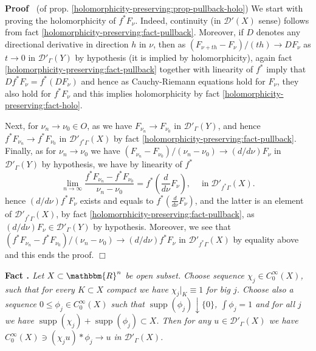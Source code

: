 \documentclass{article}
\newcommand{\nocomma}{}
\newcommand{\nosymbol}{}
\newcommand{\tmop}[1]{\ensuremath{\operatorname{#1}}}
\newcommand{\tmtextbf}[1]{{\bfseries{#1}}}
\newcommand{\tmtextit}[1]{{\itshape{#1}}}
\newcommand{\tmtextup}[1]{{\upshape{#1}}}
\newenvironment{proof}{\noindent\textbf{Proof\ }}{\hspace*{\fill}$\Box$\medskip}
\numberwithin{definition}{section}
\numberwithin{lemma}{section}
\numberwithin{proposition}{section}
{\theorembodyfont{\rmfamily}\newtheorem{remark}{Remark}
\numberwithin{remark}{section}
}
\begin{document}
\begin{proof}
  (of prop. \ref{holomorphicity-preserving:prop-pullback-holo}) We start with
  proving the holomorphicity of $f^{\ast} F_{\nu} \nosymbol$. Indeed,
  continuity (in $\mathcal{D}' ( X)$ sense) follows from fact
  \ref{holomorphicity-preserving:fact-pullback}. Moreover, if $D$ denotes any
  directional derivative in direction $h$ in $\nu$, then as $( F_{\nu + t h} -
  F_{\nu}) / ( t h) \rightarrow D F_{\nu}$ as $t \rightarrow 0$ in
  $\mathcal{D}'_{\Gamma} ( Y)$ by hypothesis (it is implied by
  holomorphicity), again fact \ref{holomorphicity-preserving:fact-pullback}
  together with linearity of $f^{\ast}$ imply that $D f^{\ast} F_{\nu} =
  f^{\ast} ( D F_{\nu})$ and hence as Cauchy-Riemann equations hold for
  $F_{\nu}$, they also hold for $f^{\ast} F_{\nu}$ and this implies
  holomorphicity by fact \ref{holomorphicity-preserving:fact-holo}.
  
  Next, for $\nu_n \rightarrow \nu_0 \in O$, as we have $F_{\nu_n} \rightarrow
  F_{\nu_0}$ in $\mathcal{D}'_{\Gamma} ( Y)$, and hence $f^{\ast} F_{\nu_n}
  \rightarrow f^{\ast} F_{\nu_0}$ in $\mathcal{D}'_{f^{\ast} \Gamma} ( X)$ by
  fact \ref{holomorphicity-preserving:fact-pullback}. Finally, as for $\nu_n
  \rightarrow \nu_0$ we have $( F_{\nu_n} - F_{\nu_0}) / ( \nu_n - \nu_0)
  \rightarrow ( d / d \nu) F_{\nu}$ in $\mathcal{D}'_{\Gamma} ( Y)$ by
  hypothesis, we have by linearity of $f^{\ast}$
  \[ \lim_{n \rightarrow \infty} \frac{f^{\ast} F_{\nu_n} - f^{\ast}
     F_{\nu_0}}{\nu_n - \nu_0} = f^{\ast} \left( \frac{d}{d \nu} F_{\nu}
     \right) \nocomma, \hspace{1em} \tmop{in} \mathcal{D}'_{f^{\ast} \Gamma} (
     X) . \]
  hence $( d / d \nu) f^{\ast} F_{\nu}$ exists and equals to $f^{\ast} \left(
  \frac{d}{d \nu} F_{\nu} \right)$, and the latter is an element of
  $\mathcal{D}'_{f^{\ast} \Gamma} ( X)$, by fact
  \ref{holomorphicity-preserving:fact-pullback}, as $( d / d \nu) F_{\nu} \in
  \mathcal{D}'_{\Gamma} ( Y)$ by hypothesis. Moreover, we see that $( f^{\ast}
  F_{\nu_n} - f^{\ast} F_{\nu_0}) / ( \nu_n - \nu_0) \rightarrow ( d / d \nu)
  f^{\ast} F_{\nu}$ in $\mathcal{D}'_{f^{\ast} \Gamma} ( X)$ by equality above
  and this ends the proof.
\end{proof}

{\noindent}\tmtextbf{Fact \tmtextup{8}.
}\tmtextit{\label{holomorphicity-preserving:fact-p3}{\cite[thm.
8.2.3]{hormander1983analysis}} Let $X \subset \mathbbm{R}^n$ be open subset.
Choose sequence $\chi_j \in C^{\infty}_0 ( X)$, such that for every $K \subset
X$ compact we have $\chi_j |_K \equiv 1$ for big $j$. Choose also a sequence
$0 \leqslant \phi_j \in C_0^{\infty} ( X)$ such that $\tmop{supp} ( \phi_j)
\downarrow \{ 0 \}$, $\int \phi_j = 1$ and for all $j$ we have $\tmop{supp} (
\chi_j) + \tmop{supp} ( \phi_j) \subset X$. Then for any $u_{} \in
\mathcal{D}'_{\Gamma} ( X)$ we have $C^{\infty}_0 ( X) \ni ( \chi_j u) \ast
\phi_j \rightarrow u$ in $\mathcal{D}'_{\Gamma} (
X)$.}{\hspace*{\fill}}{\medskip}
\end{document}
